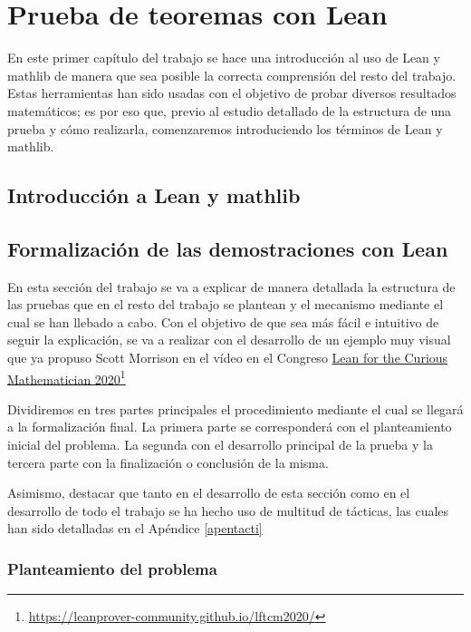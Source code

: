 \chapter{Prueba de teoremas con Lean}

En este primer capítulo del trabajo se hace una introducción al uso de
Lean y mathlib de manera que sea posible la correcta comprensión del
resto del trabajo. Estas herramientas han sido usadas con el objetivo de
probar diversos resultados matemáticos; es por eso que, previo al
estudio detallado de la estructura de una prueba y cómo realizarla,
comenzaremos introduciendo los términos de Lean y mathlib.

\section{Introducción a Lean y mathlib}

\section{Formalización de las demostraciones con Lean}

En esta sección del trabajo se va a explicar de manera detallada la
estructura de las pruebas que en el resto del trabajo se plantean y el
mecanismo mediante el cual se han llebado a cabo. Con el objetivo de que
sea más fácil e intuitivo de seguir la explicación, se va a realizar con
el desarrollo de un ejemplo muy visual que ya propuso Scott Morrison en
el vídeo \cite{video} en el Congreso
\href{https://leanprover-community.github.io/lftcm2020/}
     {Lean for the Curious Mathematician 2020}\footnote{\url{https://leanprover-community.github.io/lftcm2020/}}

     
Dividiremos en tres partes principales el procedimiento mediante el
cual se llegará a la formalización final. La primera parte se
corresponderá con el planteamiento inicial del problema. La segunda
con el desarrollo principal de la prueba y la tercera parte con la
finalización o conclusión de la misma.

Asimismo, destacar que tanto en el desarrollo de esta sección como en el
desarrollo de todo el trabajo se ha hecho uso de multitud de tácticas, las
cuales han sido detalladas en el Apéndice \ref{apentacti}

\subsection{Planteamiento del problema}

